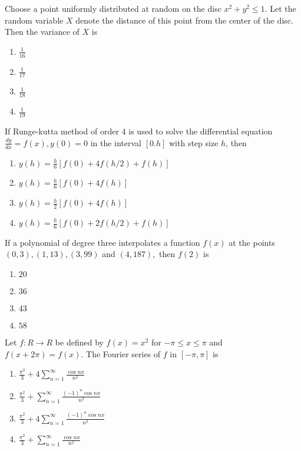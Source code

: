\item Choose a point uniformly distributed at random on the disc $x^2+y^2\leq1$. Let the random variable $X$ denote the distance of this point from the center of the disc. Then the variance of $X$ is 
\begin{enumerate}
    \item $\frac{1}{16}$
    \item $\frac{1}{17}$
    \item $\frac{1}{18}$
    \item $\frac{1}{19}$ \\
\end{enumerate}
    
\item If Runge-kutta method of order 4 is used to solve the differential equation $\frac{dy}{dx}=f(x),y(0)=0$ in the interval $[0.h]$ with step size $h$, then 
\begin{enumerate}
    \item $y(h)=\frac{h}{6}[f(0)+4f(h/2)+f(h)]$
    \item $y(h)=\frac{h}{6}[f(0)+4f(h)]$
    \item $y(h)=\frac{h}{2}[f(0)+4f(h)]$
    \item $y(h)=\frac{h}{6}[f(0)+2f(h/2)+f(h)]$ \\
\end{enumerate}

\item If a polynomial of degree three interpolates a function $f(x)$ at the points $(0, 3), (1,13),(3,99)$ and $(4,187),$ then $f(2)$ is 
\begin{enumerate}
    \item $20$
    \item $36$
    \item $43$
    \item $58$ \\
\end{enumerate}

\item Let $f:R\rightarrow R$ be defined by $f(x)=x^2$ for $-\pi \leq x \leq \pi$ and $f(x+2\pi)=f(x).$ 
The Fourier series of $f$ in $[-\pi,\pi]$ is 
\begin{enumerate}
    \item $\frac{\pi^2}{3}+4\sum_{n=1}^\infty \frac{\cos nx}{n^2}$
    \item $\frac{\pi^2}{3}+\sum_{n=1}^\infty \frac{(-1)^n \cos nx}{n^2}$
    \item $\frac{\pi^2}{3}+4\sum_{n=1}^\infty \frac{(-1)^n \cos nx}{n^2}$
    \item $\frac{\pi^2}{3}+\sum_{n=1}^\infty \frac{\cos nx}{n^2}$ \\
\end{enumerate}


